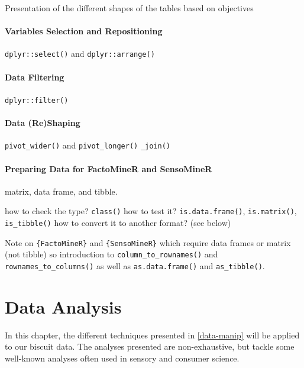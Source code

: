 \documentclass[
]{book}
\begin{document}
Presentation of the different shapes of the tables based on objectives

\hypertarget{variables-selection-and-repositioning}{%
\subsubsection{Variables Selection and Repositioning}\label{variables-selection-and-repositioning}}

\texttt{dplyr::select()} and \texttt{dplyr::arrange()}

\hypertarget{data-filtering}{%
\subsubsection{Data Filtering}\label{data-filtering}}

\texttt{dplyr::filter()}

\hypertarget{data-reshaping}{%
\subsubsection{Data (Re)Shaping}\label{data-reshaping}}

\texttt{pivot\_wider()} and \texttt{pivot\_longer()}
\texttt{\_join()}

\hypertarget{preparing-data-for-factominer-and-sensominer}{%
\subsubsection{Preparing Data for FactoMineR and SensoMineR}\label{preparing-data-for-factominer-and-sensominer}}

matrix, data frame, and tibble.

how to check the type? \texttt{class()}
how to test it? \texttt{is.data.frame()}, \texttt{is.matrix()}, \texttt{is\_tibble()}
how to convert it to another format? (see below)

Note on \texttt{\{FactoMineR\}} and \texttt{\{SensoMineR\}} which require data frames or matrix (not tibble) so introduction to \texttt{column\_to\_rownames()} and \texttt{rownames\_to\_columns()} as well as \texttt{as.data.frame()} and \texttt{as\_tibble()}.

\hypertarget{data-analysis}{%
\chapter{Data Analysis}\label{data-analysis}}

In this chapter, the different techniques presented in \ref{data-manip} will be applied to our biscuit data.
The analyses presented are non-exhaustive, but tackle some well-known analyses often used in sensory and consumer science.
\end{document}
